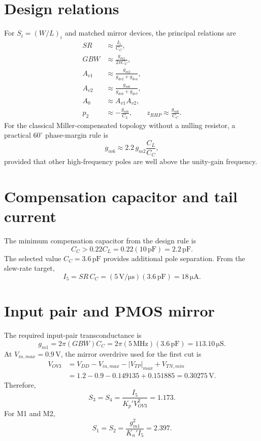 \documentclass[11pt,a4paper]{report}
\newcommand{\micro}{\mu}
\newcommand{\SI}[2]{\ensuremath{#1\,\mathrm{#2}}}
\newcommand{\ang}[1]{\ensuremath{#1^{\circ}}}
\begin{document}
\section{Design relations}
For $S_i=(W/L)_i$ and matched mirror devices, the principal relations are
\begin{align}
SR &\approx \frac{I_5}{C_C},\\
GBW &\approx \frac{g_{m1}}{2\pi C_C},\\
A_{v1} &\approx \frac{g_{m2}}{g_{ds2}+g_{ds4}},\\
A_{v2} &\approx \frac{g_{m6}}{g_{ds6}+g_{ds7}},\\
A_0 &\approx A_{v1}A_{v2},\\
p_2 &\approx -\frac{g_{m6}}{C_L},\qquad
z_{RHP}\approx \frac{g_{m6}}{C_C}.
\end{align}
For the classical Miller-compensated topology without a nulling resistor, a practical \ang{60} phase-margin rule is
\begin{equation}
g_{m6}\approx 2.2\,g_{m2}\frac{C_L}{C_C},
\end{equation}
provided that other high-frequency poles are well above the unity-gain frequency.

\section{Compensation capacitor and tail current}
The minimum compensation capacitor from the design rule is
\begin{equation}
C_C>0.22C_L=0.22(\SI{10}{pF})=\SI{2.2}{pF}.
\end{equation}
The selected value $C_C=\SI{3.6}{pF}$ provides additional pole separation. From the slew-rate target,
\begin{equation}
I_5=SR\,C_C=(\SI{5}{V/\micro s})(\SI{3.6}{pF})=\boxed{\SI{18}{\micro A}}.
\end{equation}

\section{Input pair and PMOS mirror}
The required input-pair transconductance is
\begin{equation}
g_{m1}=2\pi(GBW)C_C=2\pi(\SI{5}{MHz})(\SI{3.6}{pF})
=\boxed{\SI{113.10}{\micro S}}.
\end{equation}
At $V_{in,max}=\SI{0.9}{V}$, the mirror overdrive used for the first cut is
\begin{align}
V_{OV3}&=V_{DD}-V_{in,max}-|V_{TP}|_{max}+V_{TN,min}\\
&=1.2-0.9-0.149135+0.151885=\SI{0.30275}{V}.
\end{align}
Therefore,
\begin{equation}
S_3=S_4=\frac{I_5}{K_p'V_{OV3}^2}=\boxed{1.173}.
\end{equation}
For M1 and M2,
\begin{equation}
S_1=S_2=\frac{g_{m1}^2}{K_n'I_5}=\boxed{2.397}.
\end{equation}
\end{document}
